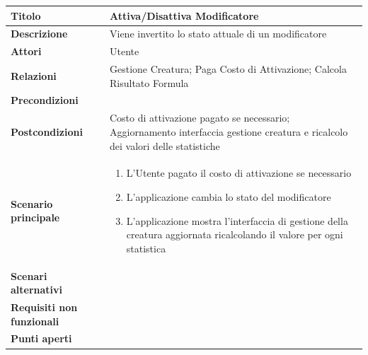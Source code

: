\documentclass[a4paper, 11pt]{article}
\begin{document}
\begin{center}
\begin{tabular}{ |p{5cm}|p{9.5cm}|  }
\hline
\textbf{Titolo} & Attiva/Disattiva Modificatore \\
\hline
\textbf{Descrizione} & Viene invertito lo stato attuale di un modificatore\\
\hline
\textbf{Attori} & Utente \\
\hline
\textbf{Relazioni} & Gestione Creatura; Paga Costo di Attivazione; Calcola Risultato Formula \\
\hline
\textbf{Precondizioni} & \\
\hline
\textbf{Postcondizioni} & Costo di attivazione pagato se necessario; Aggiornamento interfaccia gestione creatura e ricalcolo dei valori delle statistiche \\
\hline
\textbf{Scenario principale} & 
\begin{enumerate}
    \item L'Utente pagato il costo di attivazione se necessario
    \item L'applicazione cambia lo stato del modificatore 
    \item L'applicazione mostra l'interfaccia di gestione della creatura aggiornata ricalcolando il valore per ogni statistica
\end{enumerate}\\
\hline
\textbf{Scenari alternativi} & \\
\hline
\textbf{Requisiti non funzionali} & \\
\hline
\textbf{Punti aperti} & \\
\hline
\end{tabular}

\vspace{3em}


\end{center}
\end{document}
